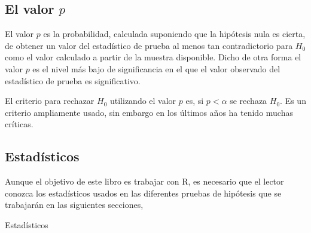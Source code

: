 \documentclass[]{book}
\begin{document}
\subsection{\texorpdfstring{El valor
\(p\)}{El valor p}}\label{el-valor-p}

El valor \(p\) es la probabilidad, calculada suponiendo que la hipótesis
nula es cierta, de obtener un valor del estadístico de prueba al menos
tan contradictorio para \(H_0\) como el valor calculado a partir de la
muestra disponible. Dicho de otra forma el valor \(p\) es el nivel más
bajo de significancia en el que el valor observado del estadístico de
prueba es significativo.

El criterio para rechazar \(H_0\) utilizando el valor \(p\) es, si
\(p<\alpha\) se rechaza \(H_0\). Es un criterio ampliamente usado, sin
embargo en los últimos años ha tenido muchas críticas.

\subsection{Estadísticos}\label{estadisticos}

Aunque el objetivo de este libro es trabajar con R, es necesario que el
lector conozca los estadísticos usados en las diferentes pruebas de
hipótesis que se trabajarán en las siguientes secciones,

\label{tab:estadisticos} Estadísticos
\end{document}
